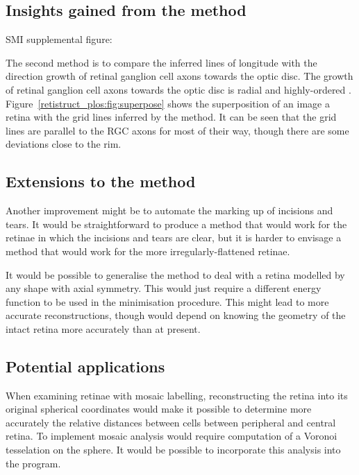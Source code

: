\documentclass[10pt]{article}
\begin{document}
\subsection*{Insights gained from the method}


SMI supplemental figure:

The second method is to compare the inferred lines of longitude with
the direction growth of retinal ganglion cell axons towards the optic
disc.  The growth of retinal ganglion cell axons towards the optic
disc is radial and highly-ordered
\cite{ErskThom09intr}. Figure~\ref{retistruct_plos:fig:superpose}
shows the superposition of an image a retina \cite{KeelEtal11neur}
with the grid lines inferred by the method. It can be seen that the
grid lines are parallel to the RGC axons for most of their way, though
there are some deviations close to the rim.


\subsection*{Extensions to the method}

Another improvement might be to automate the marking up of incisions
and tears. It would be straightforward to produce a method that would
work for the retinae in which the incisions and tears are clear, but
it is harder to envisage a method that would work for the more
irregularly-flattened retinae.

It would be possible to generalise the method to deal with a retina
modelled by any shape with axial symmetry. This would just require a
different energy function to be used in the minimisation
procedure. This might lead to more accurate reconstructions, though
would depend on knowing the geometry of the intact retina more
accurately than at present.

\subsection*{Potential applications}
\label{retistruct_plos:sec:potent-appl}

When examining retinae with mosaic labelling, reconstructing the
retina into its original spherical coordinates would make it possible
to determine more accurately the relative distances between cells
between peripheral and central retina. To implement mosaic analysis
would require computation of a Voronoi tesselation on the sphere. It
would be possible to incorporate this analysis into the
program. 
\end{document}
